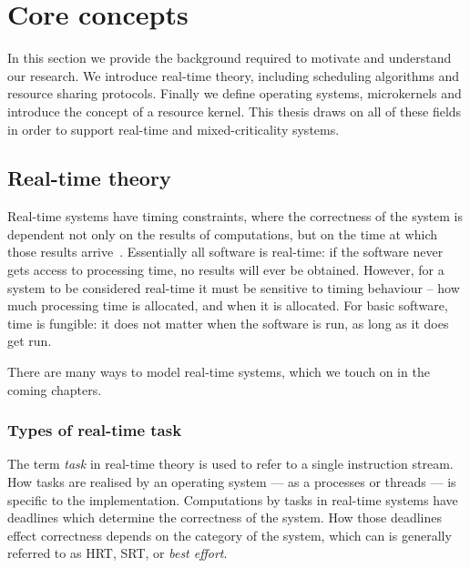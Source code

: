 




\chapter{Core concepts}
\label{chap:background}

In this section we provide the background required to motivate and understand our research.
We introduce real-time theory, including scheduling algorithms and resource sharing protocols.
Finally we define operating systems, microkernels and introduce the concept of a resource kernel.
This thesis draws on all of these fields in order to support real-time and mixed-criticality systems.

\section{Real-time theory}
\label{sec:real-time-theory}

Real-time systems have timing constraints, where the correctness of the system is dependent not only
on the results of computations, but on the time at which those results
arrive~\citep{Stankovic_88}.  Essentially all software is real-time: if the software never gets
access to processing time, no results will ever be obtained.  However, for a system
to be considered real-time it must be sensitive to timing behaviour -- how much processing time is
allocated, and when it is allocated. For basic software, time is
fungible: it does not matter when the software is run, as long as it does get run.

There are many ways to model real-time systems, which we touch on in the coming chapters. 

\subsection{Types of real-time task}

The term \emph{task} in real-time theory is used to refer to a single instruction stream.  How tasks
are realised by an operating system --- as a processes or threads --- is specific to the
implementation.  Computations by tasks in real-time systems have deadlines which determine the
correctness of the system. How those deadlines effect correctness depends on the category of the
system, which can is generally referred to as \gls{HRT}, \gls{SRT}, or \emph{best effort}.

